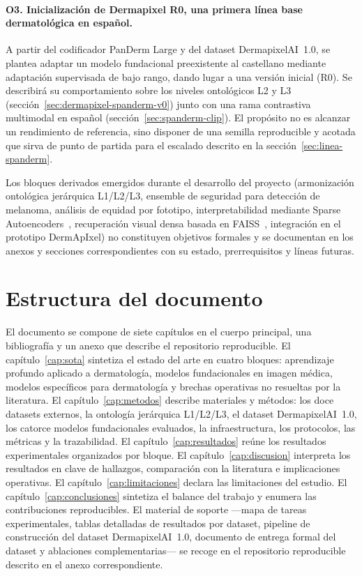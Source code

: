 \paragraph{O3. Inicialización de Dermapixel R0, una primera línea
base dermatológica en español.}
A partir del codificador PanDerm Large y del dataset
DermapixelAI~1.0, se plantea adaptar un modelo fundacional
preexistente al castellano mediante adaptación supervisada de bajo
rango, dando lugar a una versión inicial (R0). Se describirá su
comportamiento sobre los niveles ontológicos L2 y L3
(sección~\ref{sec:dermapixel-spanderm-v0}) junto con una rama
contrastiva multimodal en español
(sección~\ref{sec:spanderm-clip}). El propósito no es alcanzar un
rendimiento de referencia, sino disponer de una semilla reproducible
y acotada que sirva de punto de partida para el escalado descrito en
la sección~\ref{sec:linea-spanderm}.

Los bloques derivados emergidos durante el desarrollo del proyecto
(armonización ontológica jerárquica L1/L2/L3, ensemble de seguridad
para detección de melanoma, análisis de equidad por fototipo,
interpretabilidad mediante Sparse Autoencoders~\cite{templeton2024},
recuperación visual densa basada en FAISS~\cite{faiss2019},
integración en el prototipo DermApIxel) no constituyen objetivos
formales y se documentan en los anexos y secciones correspondientes
con su estado, prerrequisitos y líneas futuras.


\section{Estructura del documento}
\label{sec:estructura}

El documento se compone de siete capítulos en el cuerpo principal,
una bibliografía y un anexo que describe el repositorio reproducible.
El capítulo~\ref{cap:sota} sintetiza
el estado del arte en cuatro bloques: aprendizaje profundo aplicado
a dermatología, modelos fundacionales en imagen médica, modelos
específicos para dermatología y brechas operativas no resueltas por
la literatura. El capítulo~\ref{cap:metodos} describe materiales y
métodos: los doce datasets externos, la ontología jerárquica
L1/L2/L3, el dataset DermapixelAI~1.0, los catorce modelos fundacionales
evaluados, la infraestructura, los protocolos, las métricas y la
trazabilidad. El
capítulo~\ref{cap:resultados} reúne los resultados experimentales
organizados por bloque. El capítulo~\ref{cap:discusion} interpreta
los resultados en clave de hallazgos, comparación con la literatura
e implicaciones operativas. El capítulo~\ref{cap:limitaciones}
declara las limitaciones del estudio. El
capítulo~\ref{cap:conclusiones} sintetiza el balance del trabajo y
enumera las contribuciones reproducibles. El material de soporte
---mapa de tareas experimentales, tablas detalladas de resultados por
dataset, pipeline de construcción del dataset DermapixelAI~1.0,
documento de entrega formal del dataset y ablaciones
complementarias--- se recoge en el repositorio reproducible descrito
en el anexo correspondiente.
